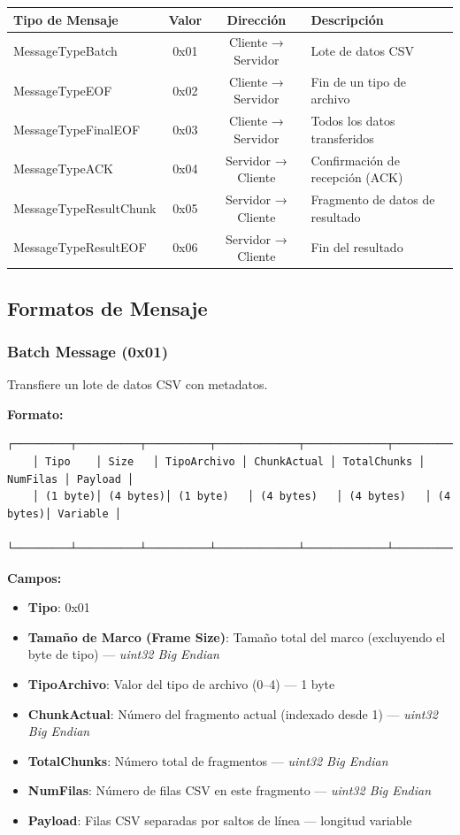\documentclass[titlepage,a4paper]{article}
\begin{document}
\begin{longtable}{|l|c|c|p{7cm}|}
	\hline
	\textbf{Tipo de Mensaje} & \textbf{Valor} & \textbf{Dirección} & \textbf{Descripción} \\
	\hline
	MessageTypeBatch & 0x01 & Cliente → Servidor & Lote de datos CSV \\
	\hline
	MessageTypeEOF & 0x02 & Cliente → Servidor & Fin de un tipo de archivo \\
	\hline
	MessageTypeFinalEOF & 0x03 & Cliente → Servidor & Todos los datos transferidos \\
	\hline
	MessageTypeACK & 0x04 & Servidor → Cliente & Confirmación de recepción (ACK) \\
	\hline
	MessageTypeResultChunk & 0x05 & Servidor → Cliente & Fragmento de datos de resultado \\
	\hline
	MessageTypeResultEOF & 0x06 & Servidor → Cliente & Fin del resultado \\
	\hline
\end{longtable}

\subsection{Formatos de Mensaje}

\subsubsection{Batch Message (0x01)}

Transfiere un lote de datos CSV con metadatos.

\textbf{Formato:}
\begin{lstlisting}[basicstyle=\ttfamily\scriptsize,breaklines=true]
	┌─────────┬──────────┬──────────┬─────────────┬─────────────┬──────────┬─────────┐
	│ Tipo    │ Size   │ TipoArchivo │ ChunkActual │ TotalChunks │ NumFilas │ Payload │
	│ (1 byte)│ (4 bytes)│ (1 byte)   │ (4 bytes)   │ (4 bytes)   │ (4 bytes)│ Variable │
	└─────────┴──────────┴──────────┴─────────────┴─────────────┴──────────┴─────────┘
\end{lstlisting}

\textbf{Campos:}
\begin{itemize}
	\item \textbf{Tipo}: 0x01
	\item \textbf{Tamaño de Marco (Frame Size)}: Tamaño total del marco (excluyendo el byte de tipo) — \textit{uint32 Big Endian}
	\item \textbf{TipoArchivo}: Valor del tipo de archivo (0–4) — 1 byte
	\item \textbf{ChunkActual}: Número del fragmento actual (indexado desde 1) — \textit{uint32 Big Endian}
	\item \textbf{TotalChunks}: Número total de fragmentos — \textit{uint32 Big Endian}
	\item \textbf{NumFilas}: Número de filas CSV en este fragmento — \textit{uint32 Big Endian}
	\item \textbf{Payload}: Filas CSV separadas por saltos de línea — longitud variable
\end{itemize}
\end{document}
